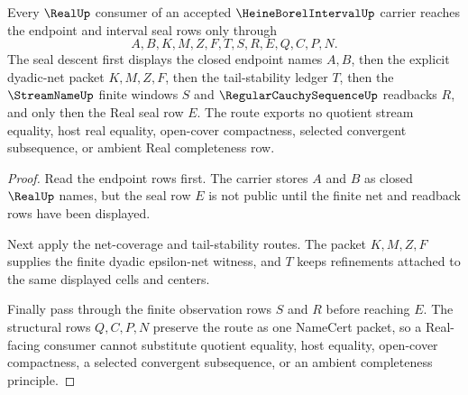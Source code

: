\begin{theorem}
\label{thm:heine-borel-interval-real-seal-descent}
Every $\RealUp$ consumer of an accepted $\HeineBorelIntervalUp$ carrier reaches the endpoint and interval seal rows only through
$$
A,B,K,M,Z,F,T,S,R,E,Q,C,P,N.
$$
The seal descent first displays the closed endpoint names $A,B$, then the explicit dyadic-net packet $K,M,Z,F$, then the tail-stability ledger $T$, then the $\StreamNameUp$ finite windows $S$ and $\RegularCauchySequenceUp$ readbacks $R$, and only then the Real seal row $E$. The route exports no quotient stream equality, host real equality, open-cover compactness, selected convergent subsequence, or ambient Real completeness row.
\end{theorem}
\begin{proof}
Read the endpoint rows first. The carrier stores $A$ and $B$ as closed $\RealUp$ names, but the seal row $E$ is not public until the finite net and readback rows have been displayed.

Next apply the net-coverage and tail-stability routes. The packet $K,M,Z,F$ supplies the finite dyadic epsilon-net witness, and $T$ keeps refinements attached to the same displayed cells and centers.

Finally pass through the finite observation rows $S$ and $R$ before reaching $E$. The structural rows $Q,C,P,N$ preserve the route as one NameCert packet, so a Real-facing consumer cannot substitute quotient equality, host equality, open-cover compactness, a selected convergent subsequence, or an ambient completeness principle.
\end{proof}

